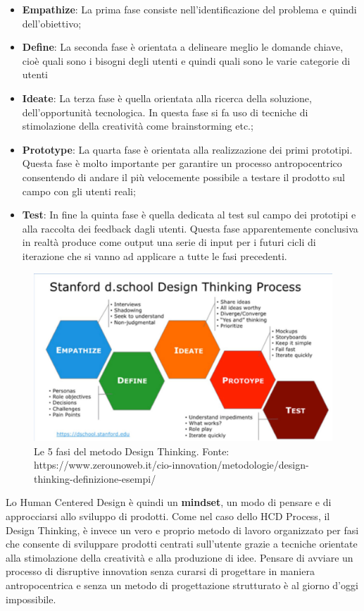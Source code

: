 \begin{itemize}
	\item \textbf{Empathize}: La prima fase consiste nell’identificazione del problema e quindi dell’obiettivo; 
	\item \textbf{Define}: La seconda fase è orientata a delineare meglio le domande chiave, cioè quali sono i bisogni degli utenti e quindi quali sono le varie categorie di utenti
	\item \textbf{Ideate}: La terza fase è quella orientata alla ricerca della soluzione, dell'opportunità tecnologica. In questa fase si fa uso di tecniche di stimolazione della creatività come brainstorming etc.;
	\item \textbf{Prototype}: La quarta fase è orientata alla realizzazione dei primi prototipi. Questa fase è molto importante per garantire un processo antropocentrico consentendo di andare il più velocemente possibile a testare il prodotto sul campo con gli utenti reali;
	\item \textbf{Test}: In fine la quinta fase è quella dedicata al test sul campo dei prototipi e alla raccolta dei feedback dagli utenti. Questa fase apparentemente conclusiva in realtà produce come output una serie di input per i futuri cicli di iterazione che si vanno ad applicare a tutte le fasi precedenti.
	
\end{itemize}

\begin{figure}
	\centering
	\includegraphics[width=\textwidth]{../immagini/designthinking}
	\caption{Le 5 fasi del metodo Design Thinking. Fonte: https://www.zerounoweb.it/cio-innovation/metodologie/design-thinking-definizione-esempi/}
\end{figure}


Lo Human Centered Design è quindi un \textbf{mindset}, un modo di pensare e di approcciarsi allo sviluppo di prodotti. Come nel caso dello HCD Process, il Design Thinking, è invece un vero e proprio metodo di lavoro organizzato per fasi che consente di sviluppare prodotti centrati sull'utente grazie a tecniche orientate alla stimolazione della creatività e alla produzione di idee. Pensare di avviare un processo di disruptive innovation senza curarsi di progettare in maniera antropocentrica e senza un metodo di progettazione strutturato è al giorno d'oggi impossibile.

